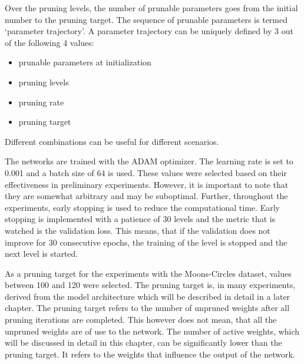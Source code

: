 Over the pruning levels, the number of prunable parameters goes from the initial number to the pruning target.
The sequence of prunable parameters is termed `parameter trajectory'.
A parameter trajectory can be uniquely defined by 3 out of the following 4 values:
\begin{itemize}
    \item prunable parameters at initialization
    \item pruning levels
    \item pruning rate
    \item pruning target
\end{itemize}

Different combinations can be useful for different scenarios.

The networks are trained with the ADAM optimizer.
The learning rate is set to 0.001 and a batch size of 64 is used.
These values were selected based on their effectiveness in preliminary experiments. However, it is important to note that they are somewhat arbitrary and may be suboptimal.
Further, throughout the experiments, early stopping is used to reduce the computational time.
Early stopping is implemented with a patience of 30 levels and the metric that is watched is the validation loss.
This means, that if the validation does not improve for 30 consecutive epochs, the training of the level is stopped and the next level is started.

As a pruning target for the experiments with the Moons-Circles dataset, values between 100 and 120 were selected.
The pruning target is, in many experiments, derived from the model architecture which will be described in detail in a later chapter.
The pruning target refers to the number of unpruned weights after all pruning iterations are completed.
This however does not mean, that all the unpruned weights are of use to the network.
The number of active weights, which will be discussed in detail in this chapter, can be significantly lower than the pruning target.
It refers to the weights that influence the output of the network.

